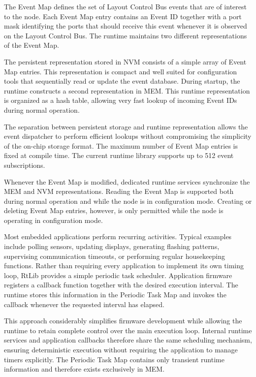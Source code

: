 The Event Map defines the set of Layout Control Bus events that are of interest 
to the node. Each Event Map entry contains an Event ID together with a port mask 
identifying the ports that should receive this event whenever it is observed on 
the Layout Control Bus. The runtime maintains two different representations of 
the Event Map.

The persistent representation stored in NVM consists of a simple array of Event 
Map entries. This representation is compact and well suited for configuration 
tools that sequentially read or update the event database. During startup, the 
runtime constructs a second representation in MEM. This runtime representation 
is organized as a hash table, allowing very fast lookup of incoming Event IDs 
during normal operation.

The separation between persistent storage and runtime representation allows the 
event dispatcher to perform efficient lookups without compromising the simplicity 
of the on-chip storage format. The maximum number of Event Map entries is fixed 
at compile time. The current runtime library supports up to 512 event subscriptions.

Whenever the Event Map is modified, dedicated runtime services synchronize the 
MEM and NVM representations. Reading the Event Map is supported both during normal 
operation and while the node is in configuration mode. Creating or deleting Event 
Map entries, however, is only permitted while the node is operating in 
configuration mode.


Most embedded applications perform recurring activities. Typical examples include 
polling sensors, updating displays, generating flashing patterns, supervising 
communication timeouts, or performing regular housekeeping functions. Rather than 
requiring every application to implement its own timing loop, RtLib provides a 
simple periodic task scheduler. Application firmware registers a callback function 
together with the desired execution interval. The runtime stores this information 
in the Periodic Task Map and invokes the callback whenever the requested interval 
has elapsed.

This approach considerably simplifies firmware development while allowing the 
runtime to retain complete control over the main execution loop. Internal 
runtime services and application callbacks therefore share the same scheduling 
mechanism, ensuring deterministic execution without requiring the application to 
manage timers explicitly. The Periodic Task Map contains only transient runtime 
information and therefore exists exclusively in MEM.


